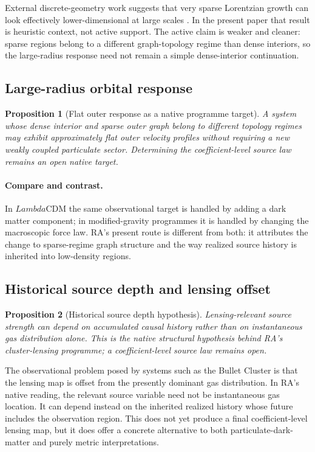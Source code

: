 \documentclass[11pt]{article}
\def\Lambda{Lambda}%
\newtheorem{proposition}{Proposition}
\begin{document}
External discrete-geometry work suggests that very sparse Lorentzian growth can look effectively lower-dimensional at large scales \cite{Durhuus2010}. In the present paper that result is heuristic context, not active support. The active claim is weaker and cleaner: sparse regions belong to a different graph-topology regime than dense interiors, so the large-radius response need not remain a simple dense-interior continuation.

\subsection{Large-radius orbital response}

\begin{proposition}[Flat outer response as a native programme target]
A system whose dense interior and sparse outer graph belong to different topology regimes may exhibit approximately flat outer velocity profiles without requiring a new weakly coupled particulate sector. Determining the coefficient-level source law remains an open native target.
\end{proposition}

\paragraph{Compare and contrast.} In $\Lambda$CDM the same observational target is handled by adding a dark matter component; in modified-gravity programmes it is handled by changing the macroscopic force law. RA's present route is different from both: it attributes the change to sparse-regime graph structure and the way realized source history is inherited into low-density regions.

\subsection{Historical source depth and lensing offset}

\begin{proposition}[Historical source depth hypothesis]
Lensing-relevant source strength can depend on accumulated causal history rather than on instantaneous gas distribution alone. This is the native structural hypothesis behind RA's cluster-lensing programme; a coefficient-level source law remains open.
\end{proposition}

The observational problem posed by systems such as the Bullet Cluster is that the lensing map is offset from the presently dominant gas distribution. In RA's native reading, the relevant source variable need not be instantaneous gas location. It can depend instead on the inherited realized history whose future includes the observation region. This does not yet produce a final coefficient-level lensing map, but it does offer a concrete alternative to both particulate-dark-matter and purely metric interpretations.
\end{document}
